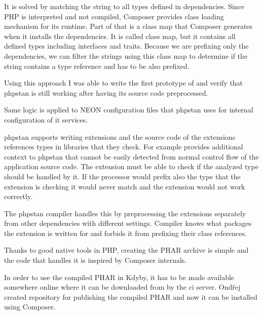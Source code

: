 It is solved by matching the string to all types defined in dependencies. Since PHP is interpreted and not compiled, Composer provides class loading mechanism for its runtime. Part of that is a class map that Composer generates when it installs the dependencies. It is called class map, but it contains all defined types including interfaces and traits. Because we are prefixing only the dependencies, we can filter the strings using this class map to determine if the string contains a type reference and has to be also prefixed.

Using this approach I was able to write the first prototype of  and verify that \gls{phpstan} is still working after having its source code preprocessed.

Same logic is applied to NEON configuration files that \gls{phpstan} uses for internal configuration of it services.

 \label{sec:refactoring:phpstan-extensions}

\gls{phpstan} supports writing extensions and the source code of the extensions references types in libraries that they check. For example  provides additional context to \gls{phpstan} that cannot be easily detected from normal control flow of the application source code. The extension must be able to check if the analyzed type should be handled by it. If the processor would prefix also the type that the extension is checking it would never match and the extension would not work correctly.

The \gls{phpstan} compiler handles this by preprocessing the extensions separately from other dependencies with different settings. Compiler knows what packages the extension is written for and forbids it from prefixing their class references.

 \label{sec:refactoring:phpstan-phar}

Thanks to good native tools in PHP, creating the PHAR archive is simple and the code that handles it is inspired by Composer internals.

 \label{sec:refactoring:phpstan-shim}

In order to use the compiled PHAR in Kdyby, it has to be made available somewhere online where it can be downloaded from by the \gls{ci} server. Ondřej created  repository for publishing the compiled PHAR and now it can be installed using Composer.

